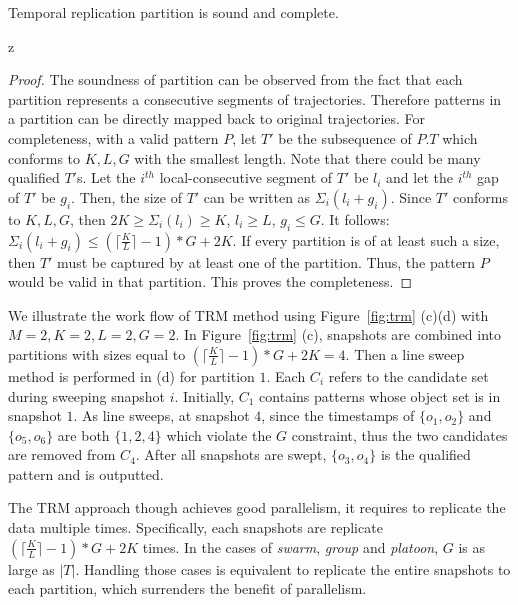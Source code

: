 \begin{theorem}
\label{thm:replication_partition}
Temporal replication partition is sound and complete.
\end{theorem}z
\begin{proof}
The soundness of partition can be observed from the fact 
that each partition represents a consecutive segments of trajectories. 
Therefore patterns in a partition can be directly mapped 
back to original trajectories. For completeness, with a
valid pattern $P$, let $T'$ be the subsequence of $P.T$ which conforms to $K,L,G$ 
with the smallest length. Note that there could be many qualified $T'$s. 
Let the $i^{th}$ local-consecutive segment of $T'$ be $l_i$ and 
let the $i^{th}$ gap of $T'$ be $g_i$. Then, the size of $T'$ can 
be written as $\Sigma_i (l_i + g_i)$.  Since $T'$ conforms to $K,L,G$, 
then $2K \geq \Sigma_i (l_i) \geq K$, $l_i \geq L$, $g_i \leq G$. 
It follows: $\Sigma_i(l_i+g_i) \leq (\lceil \frac{K}{L} \rceil -1) *G+2K$. 
If every partition is of at least such a size, then $T'$ must be
captured by at least one of the partition. Thus, the pattern $P$ would 
be valid in that partition. This proves the completeness.
\end{proof}

\begin{example}
We illustrate the work flow of  TRM method using Figure~\ref{fig:trm} (c)(d) with $M=2, K=2, L = 2, G=2$. 
In Figure~\ref{fig:trm} (c), snapshots are combined into partitions with sizes equal to 
$(\lceil \frac{K}{L} \rceil-1) *G+2K = 4$. Then a line sweep method is performed in (d) 
for partition $1$. Each $C_i$ refers to the candidate set during sweeping snapshot $i$. 
Initially, $C_1$ contains patterns whose object set is in snapshot $1$.
As line sweeps, at snapshot $4$, since the timestamps of $\{o_1,o_2\}$ and $\{o_5,o_6\}$ 
are both $\{1,2,4\}$ which violate the $G$ constraint, 
thus the two candidates are removed from $C_4$. After all snapshots are swept, 
$\{o_3,o_4\}$ is the qualified pattern and is outputted.
\end{example}

The TRM approach though achieves good parallelism, 
it requires to replicate the data multiple times. 
Specifically, each snapshots are replicate $(\lceil \frac{K}{L} \rceil -1) *G+2K$ times. 
In the cases of \emph{swarm}, \emph{group} and \emph{platoon}, $G$ is as large as $|T|$. 
Handling those cases is equivalent to replicate the entire snapshots to each partition, 
which surrenders the benefit of parallelism.




